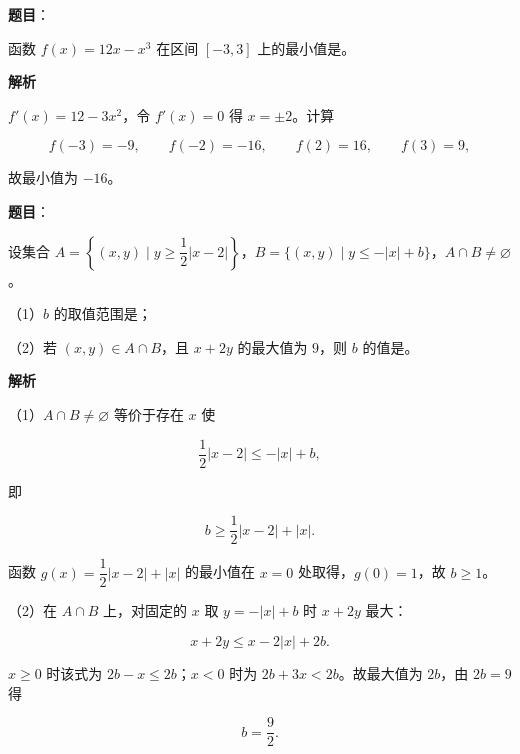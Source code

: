 \begin{answer}

\textbf{题目}：

函数 $f(x)=12x-x^3$ 在区间 $[-3,3]$ 上的最小值是\gkblank{}。

\textbf{解析}

$f'(x)=12-3x^2$，令 $f'(x)=0$ 得 $x=\pm2$。计算

\nopagebreak[4]
\[f(-3)=-9,\qquad f(-2)=-16,\qquad f(2)=16,\qquad f(3)=9,\]

故最小值为 $-16$。


\end{answer}
\begin{answer}

\textbf{题目}：

设集合 $A=\left\{(x,y)\mid y\geqslant\dfrac12|x-2|\right\}$，$B=\{(x,y)\mid y\leqslant-|x|+b\}$，$A\cap B\neq\varnothing$。

（1）$b$ 的取值范围是\gkblank{}；

（2）若 $(x,y)\in A\cap B$，且 $x+2y$ 的最大值为 $9$，则 $b$ 的值是\gkblank{}。

\textbf{解析}

（1）$A\cap B\neq\varnothing$ 等价于存在 $x$ 使

\nopagebreak[4]
\[\frac12|x-2|\leqslant-|x|+b,\]

即

\nopagebreak[4]
\[b\geqslant\frac12|x-2|+|x|.\]

函数 $g(x)=\dfrac12|x-2|+|x|$ 的最小值在 $x=0$ 处取得，$g(0)=1$，故 $b\geqslant1$。

（2）在 $A\cap B$ 上，对固定的 $x$ 取 $y=-|x|+b$ 时 $x+2y$ 最大：

\nopagebreak[4]
\[x+2y\leqslant x-2|x|+2b.\]

$x\geqslant0$ 时该式为 $2b-x\leqslant2b$；$x<0$ 时为 $2b+3x<2b$。故最大值为 $2b$，由 $2b=9$ 得

\nopagebreak[4]
\[b=\frac92.\]


\end{answer}
